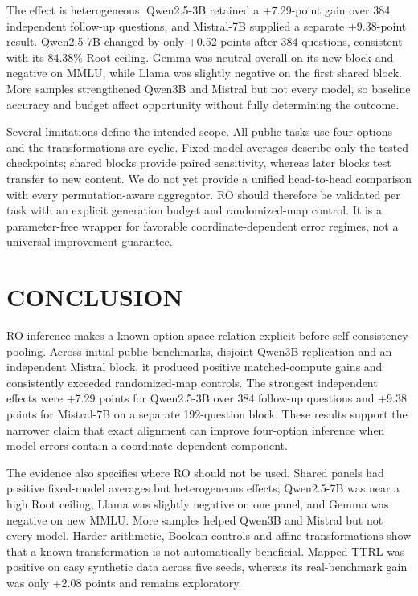 \documentclass{article}
\begin{document}
The effect is heterogeneous. Qwen2.5-3B retained a +7.29-point gain over 384 independent follow-up questions, and Mistral-7B supplied a separate +9.38-point result. Qwen2.5-7B changed by only +0.52 points after 384 questions, consistent with its 84.38\% Root ceiling. Gemma was neutral overall on its new block and negative on MMLU, while Llama was slightly negative on the first shared block. More samples strengthened Qwen3B and Mistral but not every model, so baseline accuracy and budget affect opportunity without fully determining the outcome.

Several limitations define the intended scope. All public tasks use four options and the transformations are cyclic. Fixed-model averages describe only the tested checkpoints; shared blocks provide paired sensitivity, whereas later blocks test transfer to new content. We do not yet provide a unified head-to-head comparison with every permutation-aware aggregator. RO should therefore be validated per task with an explicit generation budget and randomized-map control. It is a parameter-free wrapper for favorable coordinate-dependent error regimes, not a universal improvement guarantee.

\section{CONCLUSION}
RO inference makes a known option-space relation explicit before self-consistency pooling. Across initial public benchmarks, disjoint Qwen3B replication and an independent Mistral block, it produced positive matched-compute gains and consistently exceeded randomized-map controls. The strongest independent effects were +7.29 points for Qwen2.5-3B over 384 follow-up questions and +9.38 points for Mistral-7B on a separate 192-question block. These results support the narrower claim that exact alignment can improve four-option inference when model errors contain a coordinate-dependent component.

The evidence also specifies where RO should not be used. Shared panels had positive fixed-model averages but heterogeneous effects; Qwen2.5-7B was near a high Root ceiling, Llama was slightly negative on one panel, and Gemma was negative on new MMLU. More samples helped Qwen3B and Mistral but not every model. Harder arithmetic, Boolean controls and affine transformations show that a known transformation is not automatically beneficial. Mapped TTRL was positive on easy synthetic data across five seeds, whereas its real-benchmark gain was only +2.08 points and remains exploratory.
\end{document}
